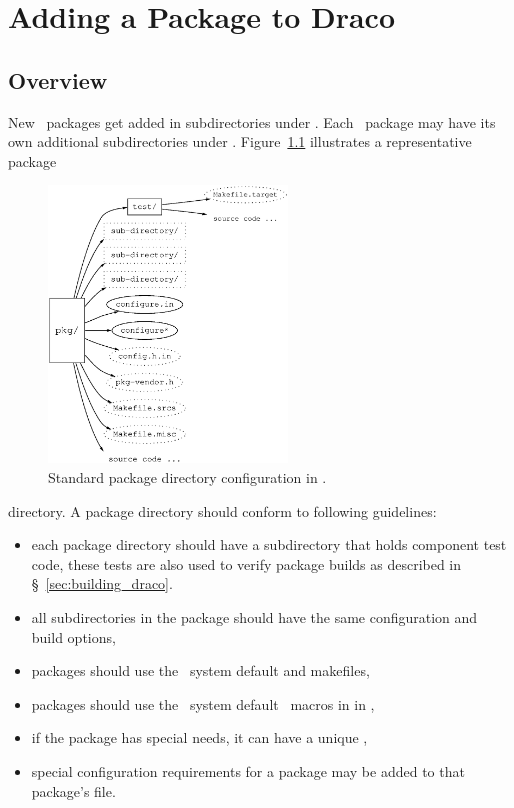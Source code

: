 
\chapter{Adding a Package to Draco}
\label{chap:adding}

\section{Overview}
\label{sec:adding_overview}

New \draco\ packages get added in subdirectories under
.  Each \draco\ package may have its own additional
subdirectories under .
Figure~\ref{fig:package} illustrates a representative package
\begin{figure}[htbp]
  \begin{center}
    \includegraphics[width=2.5in]{fig/package.eps}
    \caption{Standard package directory configuration in \draco.}
    \label{fig:package}
  \end{center}
\end{figure}
directory.  A package directory should conform to following
guidelines:
\begin{itemize}
\item each package directory should have a  subdirectory
    that holds component test code, these tests are also used to
    verify package builds as described in \S~\ref{sec:building_draco}.
\item all subdirectories in the package should have the same
  configuration and build options,
\item packages should use the \draco\ system default
   and
   makefiles,
\item packages should use the \draco\ system default \autoconf\ macros
  in  in
  ,
\item if the package has special needs, it can have a unique
  ,
\item special configuration requirements for a package may be added to 
  that package's  file.
\end{itemize}
